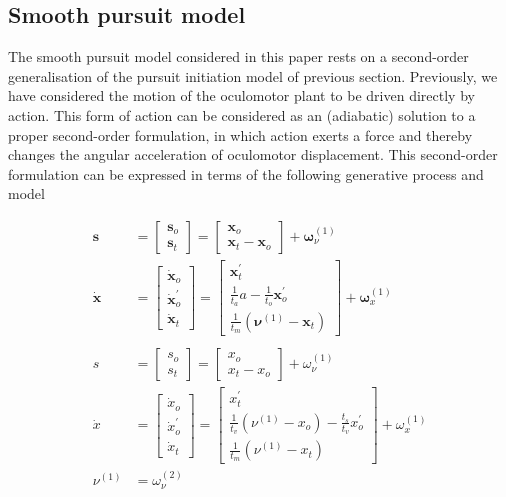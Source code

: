 \documentclass[a4paper]{article} %
\begin{document}
\subsection{Smooth pursuit model}

The smooth pursuit model considered in this paper rests on a
second-order generalisation of the pursuit initiation model of previous
section. Previously, we have considered the motion of the oculomotor
plant to be driven directly by action. This form of action can be
considered as an (adiabatic) solution to a proper second-order
formulation, in which action exerts a force and thereby changes the
angular acceleration of oculomotor displacement. This second-order
formulation can be expressed in terms of the following generative
process and model

\begin{align}
\bm{s} &=  \left[\begin{array}{c} \bm{s}_o \\ \bm{s}_t \end{array}\right] =  \left[\begin{array}{c} \bm{x}_o \\  \bm{x}_t - \bm{x}_o \end{array}\right] + \bm{\omega}^{(1)}_\nu \nonumber \\%
\bm{\dot{x}} &=  \left[\begin{array}{c} \bm{\dot{x}}_o \\ \bm{\dot{x}}^{\prime}_o \\ \bm{\dot{x}}_t \end{array}\right] =  \left[\begin{array}{c} \bm{x}^{\prime}_t \\ \frac{1}{t_a} a-\frac{1}{t_o}\bm{x}^{\prime}_o \\  \frac{1}{t_m}(\bm{\nu}^{(1)} -  \bm{x}_t) \end{array}\right] + \bm{\omega}^{(1)}_x \nonumber \\%
 \label{eq:9} \\%
s &=  \left[\begin{array}{c} s_o \\ s_t \end{array}\right] =  \left[\begin{array}{c} x_o \\  x_t - x_o \end{array}\right] + \omega^{(1)}_\nu \nonumber \\%
\dot{x} &=  \left[\begin{array}{c} \dot{x}_o \\ \dot{x}^{\prime}_o \\ \dot{x}_t \end{array}\right] =  \left[\begin{array}{c} {x}^{\prime}_t \\ \frac{1}{t_v}(\nu^{(1)}-x_o) - \frac{t_s}{t_v}{x}^{\prime}_o \\  \frac{1}{t_m}(\nu^{(1)} -  x_t)\end{array}\right] + \omega^{(1)}_x \nonumber \\  %
\nu^{(1)} &= \omega^{(2)}_\nu \nonumber %
\end{align}%
\end{document}
